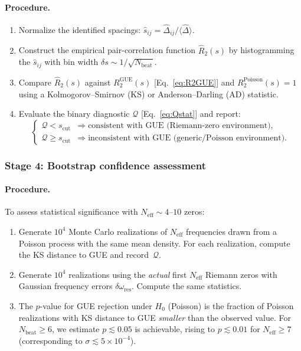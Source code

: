 \documentclass[12pt,a4paper]{article}
\begin{document}
\paragraph{Procedure.}
\begin{enumerate}
\item Normalize the identified spacings:
  $\hat{s}_{ij} = \hat\Delta_{ij}/\langle\hat\Delta\rangle$.

\item Construct the empirical pair-correlation function
  $\hat{R}_2(s)$ by histogramming the $\hat{s}_{ij}$
  with bin width
  $\delta s \sim 1/\sqrt{N_{\mathrm{beat}}}$.

\item Compare $\hat{R}_2(s)$ against
  $R_2^{\mathrm{GUE}}(s)$ [Eq.~\eqref{eq:R2GUE}]
  and $R_2^{\mathrm{Poisson}}(s) = 1$ using a
  Kolmogorov--Smirnov (KS) or Anderson--Darling (AD)
  statistic.

\item Evaluate the binary diagnostic $\mathcal{Q}$
  [Eq.~\eqref{eq:Qstat}] and report:
  \begin{equation}
    \begin{cases}
      \mathcal{Q} < s_{\mathrm{cut}} &
      \Longrightarrow\;\text{consistent with GUE
        (Riemann-zero environment),} \\[4pt]
      \mathcal{Q} \ge s_{\mathrm{cut}} &
      \Longrightarrow\;\text{inconsistent with GUE
        (generic/Poisson environment).}
    \end{cases}
  \end{equation}
\end{enumerate}

\subsubsection{Stage 4: Bootstrap confidence assessment}

\paragraph{Procedure.}
To assess statistical significance with
$N_{\mathrm{eff}}\sim 4$--$10$ zeros:
\begin{enumerate}
\item Generate $10^4$ Monte Carlo realizations of
  $N_{\mathrm{eff}}$ frequencies drawn from a
  Poisson process with the same mean density.
  For each realization, compute the KS distance
  to GUE and record~$\mathcal{Q}$.

\item Generate $10^4$ realizations using the
  \emph{actual} first $N_{\mathrm{eff}}$ Riemann
  zeros with Gaussian frequency errors
  $\delta\omega_{\mathrm{res}}$.
  Compute the same statistics.

\item The $p$-value for GUE rejection under $H_0$
  (Poisson) is the fraction of Poisson realizations
  with KS distance to GUE \emph{smaller} than the
  observed value.  For $N_{\mathrm{beat}}\ge 6$,
  we estimate $p\lesssim 0.05$ is achievable,
  rising to $p\lesssim 0.01$ for
  $N_{\mathrm{eff}}\ge 7$
  (corresponding to $\sigma\lesssim 5\times 10^{-4}$).
\end{enumerate}
\end{document}
